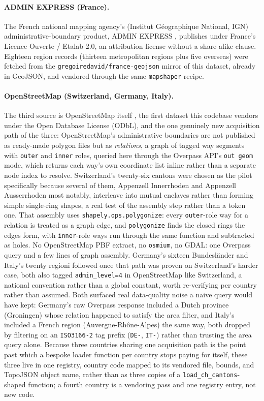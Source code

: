 \documentclass[11pt]{article}
\begin{document}
\paragraph{ADMIN EXPRESS (France).} The French national mapping
agency's (Institut Géographique National, IGN) administrative-boundary
product, ADMIN EXPRESS \autocite{ign-adminexpress}, publishes under
France's Licence Ouverte / Etalab 2.0, an attribution license without a
share-alike clause. Eighteen region records (thirteen metropolitan
regions plus five overseas) were fetched from the
\texttt{gregoiredavid/france-geojson} mirror of this dataset, already
in GeoJSON, and vendored through the same \texttt{mapshaper} recipe.

\paragraph{OpenStreetMap (Switzerland, Germany, Italy).} The third
source is OpenStreetMap itself \autocite{openstreetmap-odbl}, the
first dataset this codebase vendors under the Open Database License
(ODbL), and the one genuinely new acquisition path of the three:
OpenStreetMap's administrative boundaries are not published as
ready-made polygon files but as \emph{relations}, a graph of tagged
way segments with \texttt{outer} and \texttt{inner} roles, queried
here through the Overpass API's \texttt{out geom} mode, which returns
each way's own coordinate list inline rather than a separate node
index to resolve. Switzerland's twenty-six cantons were chosen as the
pilot specifically because several of them, Appenzell Innerrhoden and
Appenzell Ausserrhoden most notably, interleave into mutual enclaves
rather than forming simple single-ring shapes, a real test of the
assembly step rather than a token one. That assembly uses
\texttt{shapely.ops.polygonize}: every \texttt{outer}-role way for a
relation is treated as a graph edge, and \texttt{polygonize} finds the
closed rings the edges form, with \texttt{inner}-role ways run through
the same function and subtracted as holes. No OpenStreetMap PBF
extract, no \texttt{osmium}, no GDAL: one Overpass query and a few
lines of graph assembly. Germany's sixteen Bundesländer and Italy's
twenty regioni followed once that path was proven on Switzerland's
harder case, both also tagged \texttt{admin\_level=4} in OpenStreetMap
like Switzerland, a national convention rather than a global constant,
worth re-verifying per country rather than assumed. Both surfaced real
data-quality noise a naive query would have kept: Germany's raw
Overpass response included a Dutch province (Groningen) whose relation
happened to satisfy the area filter, and Italy's included a French
region (Auvergne-Rhône-Alpes) the same way, both dropped by filtering
on an \texttt{ISO3166-2} tag prefix (\texttt{DE-}, \texttt{IT-}) rather
than trusting the area query alone. Because three countries sharing
one acquisition path is the point past which a bespoke loader function
per country stops paying for itself, these three live in one registry,
country code mapped to its vendored file, bounds, and TopoJSON object
name, rather than as three copies of a
\texttt{load\_ch\_cantons}-shaped function; a fourth country is a
vendoring pass and one registry entry, not new code.
\end{document}
